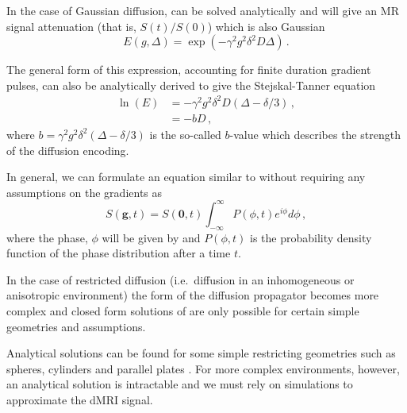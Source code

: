 In the case of Gaussian diffusion,  can be solved analytically and will give an MR signal attenuation (that is, $S(t)/S(0)$) which is also Gaussian\cite{Stejskal1965,Price1997}
\begin{equation}
  E(g, \Delta) = \exp(-\gamma^2g^2\delta^2D\Delta)\,.
  \label{eq:sgp_signal_gaussian}
\end{equation}

The general form of this expression, accounting for finite duration gradient pulses, can also be analytically derived to give the Stejskal-Tanner equation \cite{Stejskal1965,Kuchel2012}
\begin{align}
  \ln(E) &= -\gamma^2g^2\delta^2D(\Delta - \delta/3)\,,\label{eq:stejskal_tanner}\\
  &= -bD\,,
\end{align}
where $b = \gamma^2g^2\delta^2(\Delta - \delta/3)$ is the so-called $b$-value which describes the strength of the diffusion encoding. 

In general, we can formulate an equation similar to  without requiring any assumptions on the gradients as \cite{Price1997,Hall2009}
\begin{equation}
  S(\mathbf{g}, t) = S(\mathbf{0}, t) \int_{-\infty}^{\infty} P(\phi, t) e^{i\phi} d\phi\,,
  \label{eq:sig_phi_complex}
\end{equation}
where the phase, $\phi$ will be given by  and $P(\phi, t)$ is the probability density function of the phase distribution after a time $t$.

In the case of restricted diffusion (i.e.\ diffusion in an inhomogeneous or anisotropic environment) the form of the diffusion propagator becomes more complex and closed form solutions of  are only possible for certain simple geometries and assumptions.

Analytical solutions can be found for some simple restricting geometries such as spheres, cylinders and parallel plates \cite{Neuman1974, Balinov1993,Callaghan1995}.
For more complex environments, however, an analytical solution is intractable and we must rely on simulations to approximate the \acl{dMRI} signal.  

